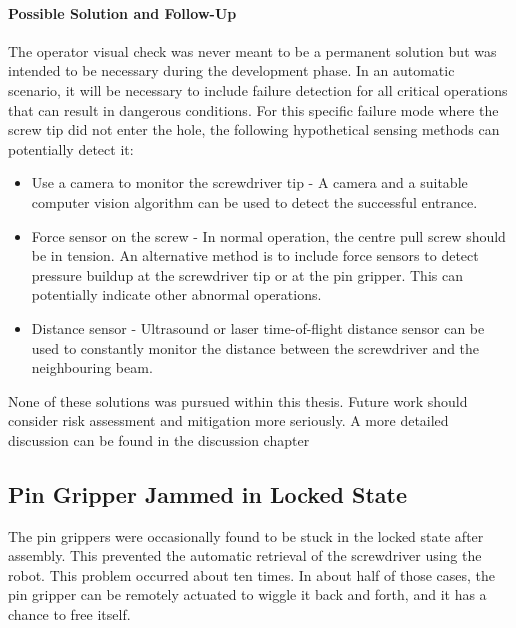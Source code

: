 \paragraph{Possible Solution and Follow-Up}
The operator visual check was never meant to be a permanent solution but was intended to be necessary during the development phase. In an automatic scenario, it will be necessary to include failure detection for all critical operations that can result in dangerous conditions. For this specific failure mode where the screw tip did not enter the hole, the following hypothetical sensing methods can potentially detect it:

\begin{itemize}
    \item Use a camera to monitor the screwdriver tip - A camera and a suitable computer vision algorithm can be used to detect the successful entrance.
    \item Force sensor on the screw - In normal operation, the centre pull screw should be in tension. An alternative method is to include force sensors to detect pressure buildup at the screwdriver tip or at the pin gripper. This can potentially indicate other abnormal operations.
    \item Distance sensor - Ultrasound or laser time-of-flight distance sensor can be used to constantly monitor the distance between the screwdriver and the neighbouring beam.

\end{itemize}
None of these solutions was pursued within this thesis. Future work should consider risk assessment and mitigation more seriously. A more detailed discussion can be found in the discussion chapter 

\subsection{Pin Gripper Jammed in Locked State}
\label{subsection:exploration-4-pin-gripper-jammed-in-locked-state}

The pin grippers were occasionally found to be stuck in the locked state after assembly. This prevented the automatic retrieval of the screwdriver using the robot. This problem occurred about ten times. In about half of those cases, the pin gripper can be remotely actuated to wiggle it back and forth, and it has a chance to free itself.

